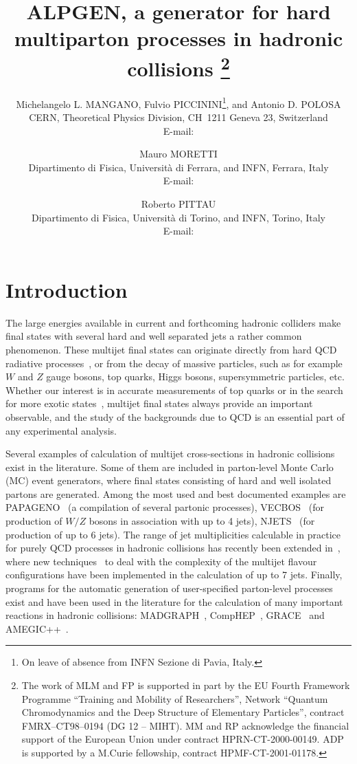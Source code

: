 \documentclass[paper]{JHEP3}
\title{ 
      ALPGEN, a generator for 
      hard multiparton processes 
      in hadronic collisions \thanks{The work of MLM and FP is
        supported in part by the EU Fourth Framework Programme
        ``Training and Mobility of Researchers'', Network ``Quantum
        Chromodynamics and the Deep Structure of Elementary
        Particles'', contract FMRX--CT98--0194 (DG 12 -- MIHT). MM and
        RP acknowledge the financial support of the European Union
        under contract HPRN-CT-2000-00149. ADP is supported by a
        M.Curie fellowship, contract HPMF-CT-2001-01178.}}
\author{
  Michelangelo L. MANGANO, Fulvio PICCININI\thanks{On leave 
          of absence from INFN Sezione di Pavia, Italy.},
and Antonio D. POLOSA\\
CERN, Theoretical Physics Division, CH~1211 Geneva 23, Switzerland
\\ E-mail: \email{michelangelo.mangano@cern.ch, fulvio.piccinini@cern.ch,
 antonio.polosa@cern.ch}}
\author{Mauro MORETTI\\
Dipartimento di Fisica, Universit\`{a} di 
Ferrara, and INFN, Ferrara, Italy \\
E-mail: \email{mauro.moretti@fe.infn.it}}
\author{Roberto PITTAU \\ 
Dipartimento di Fisica, 
Universit\`{a} di Torino, and INFN, Torino, Italy \\
E-mail: \email{roberto.pittau@to.infn.it}}
\def\grace{{\small GRACE}}
\def\amegic{{\small AMEGIC++}}
\def\madgraph{{\small MADGRAPH}}
\def\comphep{{\small CompHEP}}
\begin{document}
\section{Introduction}
\label{sec:intro}
The large energies available in current and forthcoming hadronic
colliders make final states with several hard and well separated jets
a rather common phenomenon.  These multijet final states can originate
directly from hard QCD radiative processes~\cite{Mangano:1991by}, or
from the decay of massive particles, such as for example $W$ and $Z$
gauge bosons, top quarks, Higgs bosons, supersymmetric particles, etc.
Whether our interest is in accurate measurements of top quarks or in
the search for more exotic states~\cite{Gianotti:2002xx}, multijet
final states always provide an important observable, and the study of
the backgrounds due to QCD is an essential part of any experimental
analysis.

Several examples of calculation of multijet cross-sections in hadronic
collisions exist in the literature. Some of them are included in
parton-level Monte Carlo (MC) event generators, where final states
consisting of hard and well isolated partons are generated. Among the
most used and best documented examples are
PAPAGENO~\cite{Hinchliffe:1993de} (a compilation of several partonic
processes), VECBOS~\cite{Berends:1991ax} (for production of $W/Z$
bosons in association with up to 4 jets), NJETS~\cite{Berends:1989ie}
(for production of up to 6 jets). The range of jet multiplicities
calculable in practice for purely QCD processes in hadronic collisions
has recently been extended in~\cite{Draggiotis:2002hm}, where new
techniques~\cite{Draggiotis:2000sh} to deal with the complexity of the
multijet flavour configurations have been implemented in the
calculation of up to 7 jets.  Finally, programs for the automatic
generation of user-specified parton-level processes exist and have
been used in the literature for the calculation of many important
reactions in hadronic collisions: \madgraph~\cite{Stelzer:1994ta},
\comphep~\cite{Pukhov:1999gg}, \grace~\cite{Ishikawa:1993qr} and
\amegic~\cite{Krauss:2001iv}.
\end{document}
